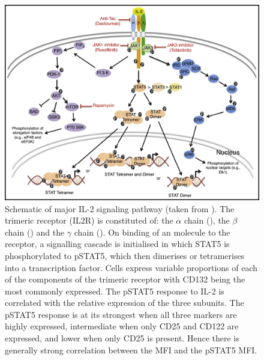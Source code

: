 \begin{figure}[h]
\centering
\includegraphics[scale=.9]{figures/IL2-pathway.jpg}
{Schematic of major IL-2 signaling pathway (taken from \citet{Liao:2013jt}).}
{
    The trimeric  receptor (IL2R) is constituted of: the $\alpha$ chain  (), the $\beta$ chain  ()
    and the $\gamma$ chain  ().
    On binding of an  molecule to the receptor, a signalling cascade is initialised in which STAT5 is phosphorylated to pSTAT5, which then dimerises or tetramerises into a transcription factor.
    Cells express variable proportions of each of the components of the trimeric receptor with CD132 being the most commonly expressed.
    The pSTAT5 response to IL-2 is correlated with the relative expression of the three subunits.
    The pSTAT5 response is at its strongest when all three markers are highly expressed, intermediate when only CD25 and CD122 are expressed, and lower when only CD25 is present.
    Hence there is generally strong correlation between the  MFI and the pSTAT5 MFI.
}
\end{figure}

